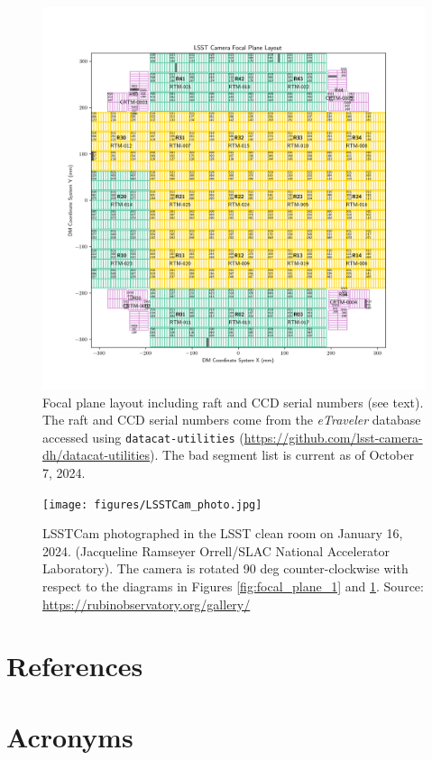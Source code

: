 \documentclass[OPS,lsstdraft,authoryear,toc]{lsstdoc}
\begin{document}
\begin{figure}
  \centering
  \includegraphics[width=\textwidth]{figures/LSSTCam_fp_layout_seth_Oct2024.png}
  \caption{Focal plane layout including raft and CCD serial numbers (see text). The raft and CCD serial numbers come from the \emph{eTraveler} database accessed using {\tt{datacat-utilities}} (\url{https://github.com/lsst-camera-dh/datacat-utilities}). The bad segment list is current as of October 7, 2024.}
  \label{fig:focal_plane_2}
\end{figure}

\clearpage

\begin{figure}
  \centering
  \texttt{[image: figures/LSSTCam\_photo.jpg]}
  \caption{LSSTCam photographed in the LSST clean room on January 16, 2024. (Jacqueline Ramseyer Orrell/SLAC National Accelerator Laboratory). The camera is rotated 90 deg counter-clockwise with respect to the diagrams in Figures \ref{fig:focal_plane_1} and \ref{fig:focal_plane_2}. Source: \url{https://rubinobservatory.org/gallery/}}
  \label{fig:focal_plane_3}
\end{figure}

\appendix
\section{References} \label{sec:bib}
\renewcommand{\refname}{} %


\section{Acronyms} \label{sec:acronyms}

\end{document}

